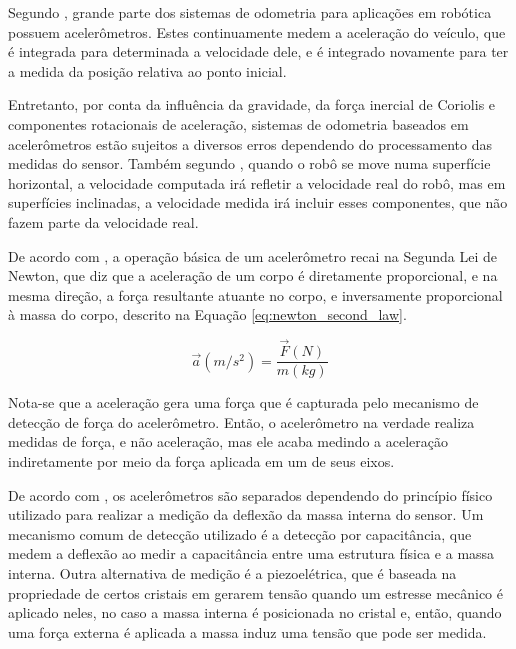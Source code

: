 \documentclass[acronym, symbols, table]{fei}
\begin{document}
				Segundo \textcite{NISTLER2011413}, grande parte dos sistemas de odometria para aplicações em robótica possuem acelerômetros. Estes continuamente medem a aceleração do veículo, que é integrada para determinada a velocidade dele, e é integrado novamente para ter a medida da posição relativa ao ponto inicial.
				
				Entretanto, por conta da influência da gravidade, da força inercial de Coriolis \cite{persson1998we} e componentes rotacionais de aceleração, sistemas de odometria baseados em acelerômetros estão sujeitos a diversos erros dependendo do processamento das medidas do sensor. Também segundo \textcite{NISTLER2011413}, quando o robô se move numa superfície horizontal, a velocidade computada irá refletir a velocidade real do robô, mas em superfícies inclinadas, a velocidade medida irá incluir esses componentes, que não fazem parte da velocidade real.
			
				De acordo com \textcite{dadafshar2014accelerometer}, a operação básica de um acelerômetro recai na Segunda Lei de Newton, que diz que a aceleração de um corpo é diretamente proporcional, e na mesma direção, a força resultante atuante no corpo, e inversamente proporcional à massa do corpo, descrito na Equação \ref{eq:newton_second_law}.
				
				\begin{equation}\label{eq:newton_second_law}
					\overrightarrow{a}(m/s^2) = \frac{\overrightarrow{F}(N)}{m(kg)}
				\end{equation}
			
				Nota-se que a aceleração gera uma força que é capturada pelo mecanismo de detecção de força do acelerômetro. Então, o acelerômetro na verdade realiza medidas de força, e não aceleração, mas ele acaba medindo a aceleração indiretamente por meio da força aplicada em um de seus eixos.
				
				De acordo com \textcite{siegwart2011introduction}, os acelerômetros são separados dependendo do princípio físico utilizado para realizar a medição da deflexão da massa interna do sensor. Um mecanismo comum de detecção utilizado é a detecção por capacitância, que medem a deflexão ao medir a capacitância entre uma estrutura física e a massa interna. Outra alternativa de medição é a piezoelétrica, que é baseada na propriedade de certos cristais em gerarem tensão quando um estresse mecânico é aplicado neles, no caso a massa interna é posicionada no cristal e, então, quando uma força externa é aplicada a massa induz uma tensão que pode ser medida.
				
\end{document}
